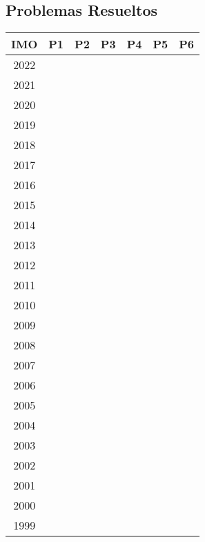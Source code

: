 \documentclass[11pt]{scrartcl}
\begin{document}
    \subsection*{Problemas Resueltos}
    \begin{center} 
        \begin{tabular}{| c | c | c | c | c | c | c |}
            \hline
            IMO & P1 & P2 & P3 & P4 & P5 & P6 \\
            \hline
            2022 & & & & & & \\
            \hline
            2021 & & & & & & \\
            \hline
            2020 & & & & & & \\
            \hline
            2019 & & & & & & \\
            \hline
            2018 & & & & & & \\
            \hline
            2017 & & & & & & \\
            \hline
            2016 & & & & & & \\
            \hline
            2015 & & & & & & \\
            \hline
            2014 & & & & & & \\
            \hline
            2013 & & & & & & \\
            \hline
            2012 & & & & & & \\
            \hline
            2011 & & & & & & \\
            \hline
            2010 & & & & & & \\
            \hline
            2009 & & & & & & \\
            \hline
            2008 & & & & & & \\
            \hline
            2007 & & & & & & \\
            \hline
            2006 & & & & & & \\
            \hline
            2005 & & & & & & \\
            \hline
            2004 & & & & & & \\
            \hline
            2003 & & & & & & \\
            \hline
            2002 & & & & & & \\
            \hline
            2001 & & & & & & \\
            \hline
            2000 & & & & & & \\
            \hline
            1999 & & & & & & \\
            \hline
        \end{tabular}
    \end{center}
    \eject
\end{document}
